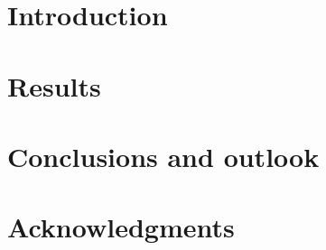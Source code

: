 \documentclass[a4paper,fleqn]{cas-sc}
\begin{document}
\section{Introduction}
\noindent

\section{Results}

\section{Conclusions and outlook}

\section{Acknowledgments}



\end{document}
